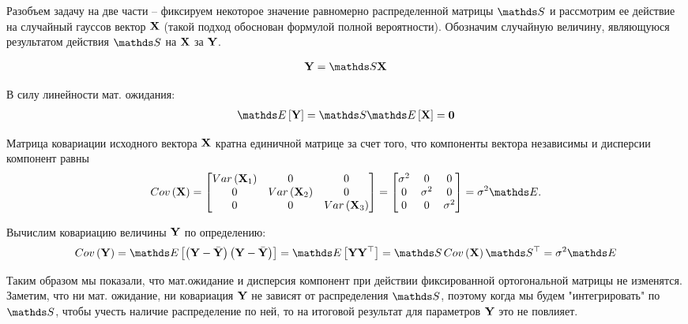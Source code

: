 Разобъем задачу на две части -- фиксируем некоторое значение равномерно распределенной матрицы $\bbS$ и рассмотрим ее действие на случайный гауссов вектор $\mathbf{X}$ (такой подход обоснован формулой полной вероятности). Обозначим случайную величину, являющуюся результатом действия $\bbS$ на $\mathbf{X}$ за $\mathbf{Y}$.  

\begin{gather}
	\mf{Y} = \bbS \mf{X} \notag 
\end{gather}

В силу линейности мат. ожидания:
\begin{gather}
		\bbE \left[ \mf{Y} \right] = \bbS \bbE \left[ \mf{X} \right] = \mf{0} \notag
\end{gather}

Матрица ковариации исходного вектора $\mathbf{X}$ кратна единичной матрице за счет того, что компоненты вектора независимы и дисперсии компонент равны
\begin{gather}
	Cov \lb \mf{X} \rb =
	\begin{bmatrix}
		Var \lb \mf{X}_1 \rb & 0 & 0 \\
		0 & Var \lb \mf{X}_2 \rb & 0 \\
		0 & 0 & Var \lb \mf{X}_3 \rb 
	\end{bmatrix} =
	\begin{bmatrix}
		\sigma^2 & 0 & 0 \\
		0 & \sigma^2 & 0 \\
		0 & 0 & \sigma^2 
	\end{bmatrix} = 
	\sigma^2 \bbE . \notag
\end{gather}

Вычислим ковариацию величины $\mathbf{Y}$ по определению:
\begin{gather}
		Cov \lb \mf{Y} \rb = \bbE \left[ \lb \mf{Y} - \bar{\mf{Y}} \rb \lb \mf{Y} - \bar{\mf{Y}} \rb \right] = \bbE \left[ \mf{Y} \mf{Y}^\top \right] = \bbS \, Cov \lb \mf{X} \rb \bbS^\top = \sigma^2 \bbE \notag
\end{gather}

Таким образом мы показали, что мат.ожидание и дисперсия компонент при действии фиксированной ортогональной матрицы не изменятся. Заметим, что ни мат. ожидание, ни ковариация $\mathbf{Y}$ не зависят от распределения $\bbS$, поэтому когда мы будем "интегрировать" по $\bbS$, чтобы учесть наличие распределение по ней, то на итоговой результат для параметров $\mathbf{Y}$ это не повлияет.   


